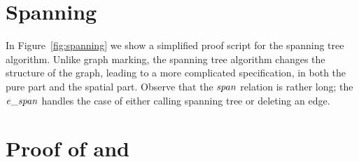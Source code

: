 
\appendix

\section{Spanning}
\label{apx:spanning}



In Figure~\ref{fig:spanning} we show a simplified proof script for
the spanning tree algorithm.  Unlike graph marking, the spanning tree algorithm changes the
structure of the graph, leading to a more complicated specification,
in both the pure part and the spatial part. Observe that the $\mathit{span}$ relation is
rather long; the $\mathit{e\_span}$ handles the case of either calling spanning tree or deleting an edge.




\section{Proof of  and }
\label{apx:ruleproofs}

